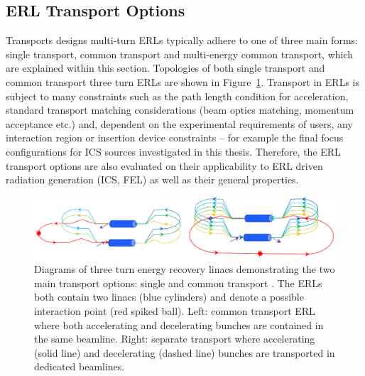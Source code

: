 \documentclass[../main.tex]{subfiles}
\begin{document}
\subsection{ERL Transport Options}
\label{sec:ERL_transport_options}

Transports designs multi-turn ERLs typically adhere to one of three main forms: single transport, common transport and multi-energy common transport, which are explained within this section. Topologies of both single transport and common transport three turn ERLs are shown in Figure~\ref{fig:single_common_transport}. Transport in ERLs is subject to many constraints such as the path length condition for acceleration, standard transport matching considerations (beam optics matching, momentum acceptance etc.) and, dependent on the experimental requirements of users, any interaction region or insertion device constraints -- for example the final focus configurations for ICS sources investigated in this thesis. Therefore, the ERL transport options are also evaluated on their applicability to ERL driven radiation generation (ICS, FEL) as well as their general properties.
\begin{figure}[!h]
\centering
\includegraphics[width=\textwidth]{Figures/Energy_Recovery_Linac_Design/Single_Common_Transport.pdf}
\caption{Diagrams of three turn energy recovery linacs demonstrating the two main transport options: single and common transport \cite{segurana2022construction}. The ERLs both contain two linacs (blue cylinders) and denote a possible interaction point (red spiked ball). Left: common transport ERL where both accelerating and decelerating bunches are contained in the same beamline. Right: separate transport where accelerating (solid line) and decelerating (dashed line) bunches are transported in dedicated beamlines.}
\label{fig:single_common_transport}
\end{figure}
\end{document}
